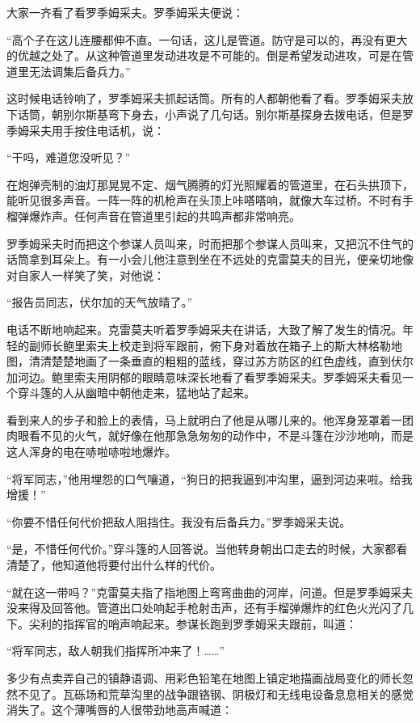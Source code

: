大家一齐看了看罗季姆采夫。罗季姆采夫便说：

“高个子在这儿连腰都伸不直。一句话，这儿是管道。防守是可以的，再没有更大的优越之处了。从这种管道里发动进攻是不可能的。倒是希望发动进攻，可是在管道里无法调集后备兵力。”

这时候电话铃响了，罗季姆采夫抓起话筒。所有的人都朝他看了看。罗季姆采夫放下话筒，朝别尔斯基弯下身去，小声说了几句话。别尔斯基探身去拨电话，但是罗季姆采夫用手按住电话机，说：

“干吗，难道您没听见？”

在炮弹壳制的油灯那晃晃不定、烟气腾腾的灯光照耀着的管道里，在石头拱顶下，能听见很多声音。一阵一阵的机枪声在头顶上咔嗒嗒响，就像大车过桥。不时有手榴弹爆炸声。任何声音在管道里引起的共鸣声都非常响亮。

罗季姆采夫时而把这个参谋人员叫来，时而把那个参谋人员叫来，又把沉不住气的话筒拿到耳朵上。有一小会儿他注意到坐在不远处的克雷莫夫的目光，便亲切地像对自家人一样笑了笑，对他说：

“报告员同志，伏尔加的天气放晴了。”

电话不断地响起来。克雷莫夫听着罗季姆采夫在讲话，大致了解了发生的情况。年轻的副师长鲍里索夫上校走到将军跟前，俯下身对着放在箱子上的斯大林格勒地图，清清楚楚地画了一条垂直的粗粗的蓝线，穿过苏方防区的红色虚线，直到伏尔加河边。鲍里索夫用阴郁的眼睛意味深长地看了看罗季姆采夫。罗季姆采夫看见一个穿斗篷的人从幽暗中朝他走来，猛地站了起来。

看到来人的步子和脸上的表情，马上就明白了他是从哪儿来的。他浑身笼罩着一团肉眼看不见的火气，就好像在他那急急匆匆的动作中，不是斗篷在沙沙地响，而是这人浑身的电在哧啦哧啦地爆炸。

“将军同志，”他用埋怨的口气嚷道，“狗日的把我逼到冲沟里，逼到河边来啦。给我增援！”

“你要不惜任何代价把敌人阻挡住。我没有后备兵力。”罗季姆采夫说。

“是，不惜任何代价。”穿斗篷的人回答说。当他转身朝出口走去的时候，大家都看清楚了，他知道他将要付出什么样的代价。

“就在这一带吗？”克雷莫夫指了指地图上弯弯曲曲的河岸，问道。但是罗季姆采夫没来得及回答他。管道出口处响起手枪射击声，还有手榴弹爆炸的红色火光闪了几下。尖利的指挥官的哨声响起来。参谋长跑到罗季姆采夫跟前，叫道：

“将军同志，敌人朝我们指挥所冲来了！……”

多少有点卖弄自己的镇静语调、用彩色铅笔在地图上镇定地描画战局变化的师长忽然不见了。瓦砾场和荒草沟里的战争跟铬钢、阴极灯和无线电设备息息相关的感觉消失了。这个薄嘴唇的人很带劲地高声喊道：

